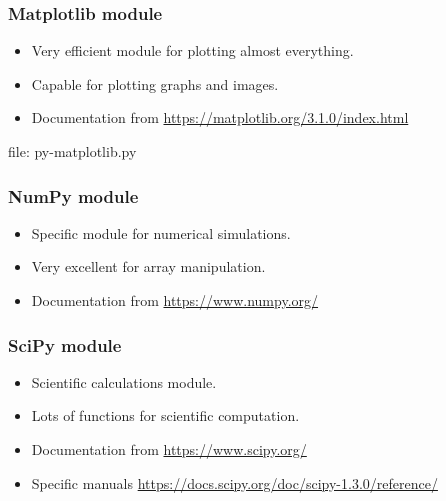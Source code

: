 \begin{frame}[fragile]
\frametitle{Matplotlib module}

\begin{itemize}
\item Very efficient module for plotting almost everything.
\item Capable for plotting graphs and images.
\item Documentation from \url{https://matplotlib.org/3.1.0/index.html}
\end{itemize}

\newcommand{\newfilename}{py-matplotlib.py}

file: \newfilename

\end{frame}


\begin{frame}[fragile]
\frametitle{NumPy module}

\begin{itemize}
\item Specific module for numerical simulations.
\item Very excellent for array manipulation.
\item Documentation from \url{https://www.numpy.org/}
\end{itemize}

%

\end{frame}


\begin{frame}[fragile]
\frametitle{SciPy module}

\begin{itemize}
\item Scientific calculations module.
\item Lots of functions for scientific computation.
\item Documentation from \url{https://www.scipy.org/}
\item Specific manuals \url{https://docs.scipy.org/doc/scipy-1.3.0/reference/}
\end{itemize}

%

\end{frame}

